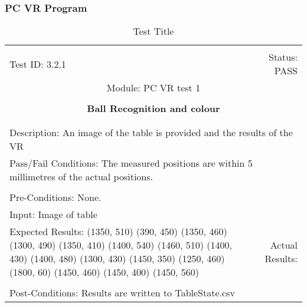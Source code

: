\documentclass[titlepage]{article}
\begin{document}
\subsubsection{PC VR Program}
\begin{center}%
\begin{table}[h!]
\begin{tabular}{|l r|}\hline&\\[-2mm]
	Test ID: 3.2.1	&Status: PASS\\[-3mm]
	\multicolumn{2}{|c|}{Module: PC VR test 1}\\&\\
	\multicolumn{2}{|c|}{\textbf{\large{Ball Recognition and colour}}}\\&\\\hline&\\[-3mm]
	\multicolumn{2}{|p{\textwidth}|}{Description: An image of the table is provided and the results of the VR }\\\hline
	\multicolumn{2}{|p{\textwidth}|}{Pass/Fail Conditions: The measured positions are within 5 millimetres of the actual positions.}\\[1mm]\hline&\\[-3mm]
	\multicolumn{2}{|p{\textwidth}|}{Pre-Conditions: None.}\\[4mm]
	\multicolumn{2}{|p{\textwidth}|}{Input: Image of table}\\[2mm]\hline
	\multicolumn{1}{|p{0.49\textwidth}}{Expected Results:\newline
(1350, 510)\newline
(390, 450)\newline
(1350, 460)\newline
(1300, 490)\newline
(1350, 410)\newline
(1400, 540)\newline
(1460, 510)\newline
(1400, 430)\newline
(1400, 480)\newline
(1300, 430)\newline
(1450, 350)\newline
(1250, 460)\newline
(1800, 60)\newline
(1450, 460)\newline
(1450, 400)\newline
(1450, 560)\newline}	&\multicolumn{1}{|p{0.45\textwidth}|}{Actual Results: }\\\hline&\\[-3mm]
	\multicolumn{2}{|p{\textwidth}|}{Post-Conditions: Results are written to TableState.csv}\\\hline
\end{tabular}
\caption{Test Title}
\end{table}
\end{center}
\newpage
\end{document}
